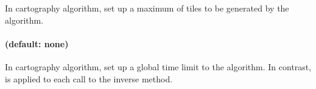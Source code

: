 In cartography algorithm, set up a maximum of tiles to be generated by the algorithm.


\paragraph{ (default: none)}

In cartography algorithm, set up a global time limit to the algorithm.
In contrast,  is applied to each call to the inverse method.


%
%
%
%
%


